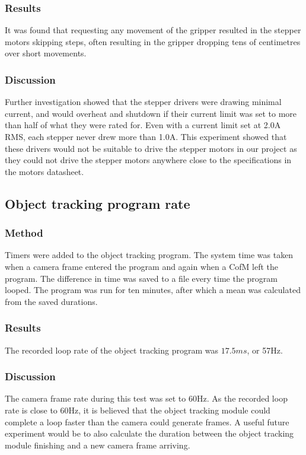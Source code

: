 \documentclass[conference]{IEEEtran}
\begin{document}
	\subsubsection{Results}
	It was found that requesting any movement of the gripper resulted in the stepper motors skipping steps, often resulting in the gripper dropping tens of centimetres over short movements. 
	\subsubsection{Discussion}
	Further investigation showed that the stepper drivers were drawing minimal current, and would overheat and shutdown if their current limit was set to more than half of what they were rated for. Even with a current limit set at 2.0A RMS, each stepper never drew more than 1.0A. This experiment showed that these drivers would not be suitable to drive the stepper motors in our project as they could not drive the stepper motors anywhere close to the specifications in the	 motors datasheet.
	
		
		\subsection{Object tracking program rate}
		\subsubsection{Method}
		Timers were added to the object tracking program. The system time was taken when a camera frame entered the program and again when a CofM left the program. The difference in time was saved to a file every time the program looped. The program was run for ten minutes, after which a mean was calculated from the saved durations.
		\subsubsection{Results}
		The recorded loop rate of the object tracking program was $17.5ms$, or 57Hz.
		\subsubsection{Discussion}
		The camera frame rate during this test was set to 60Hz. As the recorded loop rate is close to 60Hz, it is believed that the object tracking module could complete a loop faster than the camera could generate frames. A useful future experiment would be to also calculate the duration between the object tracking module finishing and a new camera frame arriving.
		
\end{document}
